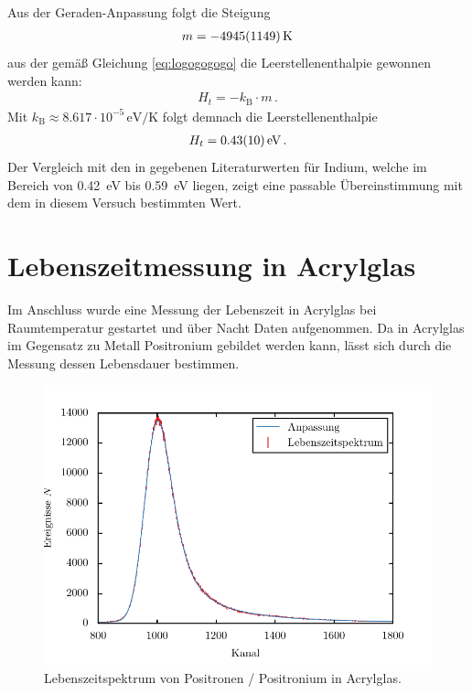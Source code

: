 \documentclass[11pt, a4paper]{article}
\numberwithin{equation}{section}
\begin{document}
Aus der Geraden-Anpassung folgt die Steigung
\begin{align*}
	m = \SI{-4945 +- 1149}{\kelvin}
\end{align*}
aus der gemäß Gleichung \eqref{eq:logogogogo} die Leerstellenenthalpie gewonnen werden kann:
\begin{align*}
	H_t = -k_\mathrm{B} \cdot m \, \text{.}
\end{align*}
Mit $k_\mathrm{B} \approx \num{8.617} \cdot 10^{-5} \, \si{\eV\per\kelvin}$ \cite{codata} folgt demnach die Leerstellenenthalpie
\begin{align*}
	H_t = \SI{0.43 +- 0.10}{\electronvolt} \, \text{.}
\end{align*}
Der Vergleich mit den in \cite{indium} gegebenen Literaturwerten für Indium, welche im Bereich von \SI{0.42}{\eV} bis \SI{0.59}{\eV} liegen, zeigt eine passable Übereinstimmung mit dem in diesem Versuch bestimmten Wert.








\section{Lebenszeitmessung in Acrylglas}
Im Anschluss wurde eine Messung der Lebenszeit in Acrylglas bei Raumtemperatur gestartet und über Nacht Daten aufgenommen.
Da in Acrylglas im Gegensatz zu Metall Positronium gebildet werden kann, lässt sich durch die Messung dessen Lebensdauer bestimmen.

\begin{figure}[h]
	\centering
	\includegraphics{./figures/acryl_glas.pdf}
	\caption{Lebenszeitspektrum von Positronen / Positronium in Acrylglas.}
\end{figure}
\end{document}
